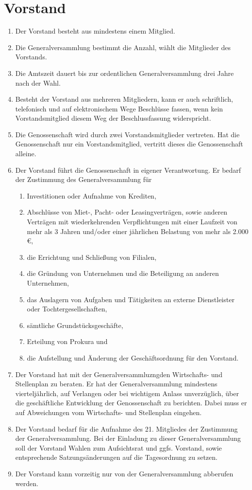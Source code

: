 \documentclass[a4paper, 12pt]{scrartcl}
\begin{document}
\section{Vorstand}
\begin{enumerate}
  \item Der Vorstand besteht aus mindestens einem Mitglied.
  \item Die Generalversammlung bestimmt die Anzahl, wählt die Mitglieder des Vorstands.
  \item Die Amtszeit dauert bis zur ordentlichen Generalversammlung drei Jahre nach der Wahl.
  \item Besteht der Vorstand aus mehreren Mitgliedern, kann er auch schriftlich, telefonisch und auf elektronischem Wege Beschlüsse fassen, wenn kein Vorstandsmitglied diesem Weg der Beschlussfassung widerspricht.
  \item Die Genossenschaft wird durch zwei Vorstandsmitglieder vertreten. Hat die Genossenschaft nur ein Vorstandsmitglied, vertritt dieses die Genossenschaft alleine.
  \item Der Vorstand führt die Genossenschaft in eigener Verantwortung. Er bedarf der Zustimmung des Generalversammlung für
  \begin{enumerate}
    \item Investitionen oder Aufnahme von Krediten,
    \item Abschlüsse von Miet-, Pacht- oder Leasingverträgen, sowie anderen Verträgen mit wiederkehrenden Verpflichtungen mit einer Laufzeit von mehr als 3 Jahren und/oder einer jährlichen Belastung von mehr als 2.000 \euro,
    \item die Errichtung und Schließung von Filialen,
    \item die Gründung von Unternehmen und die Beteiligung an anderen Unternehmen,
    \item das Auslagern von Aufgaben und Tätigkeiten an externe Dienstleister oder Tochtergesellschaften,
    \item sämtliche Grundstücksgeschäfte,
    \item Erteilung von Prokura und
    \item die Aufstellung und Änderung der Geschäftsordnung für den Vorstand.
  \end{enumerate}
  \item Der Vorstand hat mit der Generalversammluzngden Wirtschafts- und Stellenplan zu beraten. Er hat der Generalversammlung mindestens vierteljährlich, auf Verlangen oder bei wichtigem Anlass unverzüglich, über die geschäftliche Entwicklung der Genossenschaft zu berichten. Dabei muss er auf Abweichungen vom Wirtschafts- und Stellenplan eingehen.
  \item Der Vorstand bedarf für die Aufnahme des 21. Mitgliedes der Zustimmung der Generalversammlung. Bei der Einladung zu dieser Generalversammlung soll der Vorstand Wahlen zum Aufsichtsrat und ggfs. Vorstand, sowie entsprechende Satzungsänderungen auf die Tagesordnung zu setzen.
  \item Der Vorstand kann vorzeitig nur von der Generalversammlung abberufen werden.
\end{enumerate}
\end{document}
